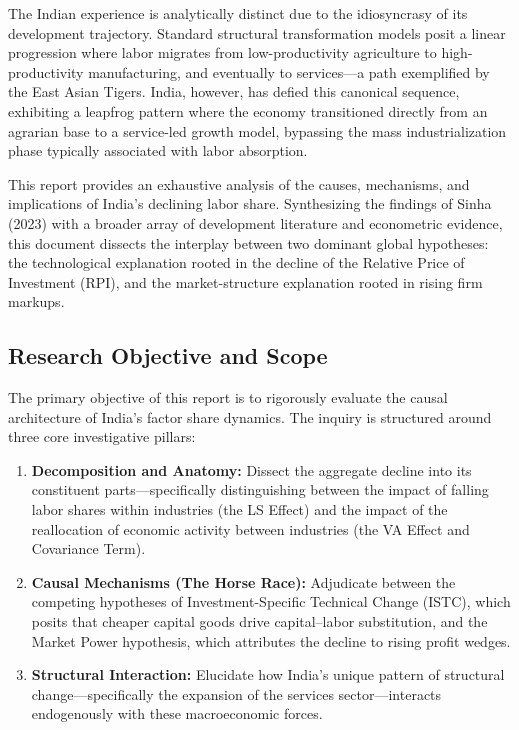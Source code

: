 \documentclass[12pt]{article}
\begin{document}
The Indian experience is analytically distinct due to the idiosyncrasy of its development trajectory. Standard structural transformation models posit a linear progression where labor migrates from low-productivity agriculture to high-productivity manufacturing, and eventually to services—a path exemplified by the East Asian Tigers. India, however, has defied this canonical sequence, exhibiting a leapfrog pattern where the economy transitioned directly from an agrarian base to a service-led growth model, bypassing the mass industrialization phase typically associated with labor absorption.

This report provides an exhaustive analysis of the causes, mechanisms, and implications of India's declining labor share. Synthesizing the findings of Sinha (2023) with a broader array of development literature and econometric evidence, this document dissects the interplay between two dominant global hypotheses: the technological explanation rooted in the decline of the Relative Price of Investment (RPI), and the market-structure explanation rooted in rising firm markups.
\newpage
\subsection{Research Objective and Scope}
The primary objective of this report is to rigorously evaluate the causal architecture of India's factor share dynamics. The inquiry is structured around three core investigative pillars:
\begin{enumerate}[leftmargin=*,itemsep=4pt]
\item \textbf{Decomposition and Anatomy:} Dissect the aggregate decline into its constituent parts—specifically distinguishing between the impact of falling labor shares within industries (the LS Effect) and the impact of the reallocation of economic activity between industries (the VA Effect and Covariance Term).
\item \textbf{Causal Mechanisms (The Horse Race):} Adjudicate between the competing hypotheses of Investment-Specific Technical Change (ISTC), which posits that cheaper capital goods drive capital–labor substitution, and the Market Power hypothesis, which attributes the decline to rising profit wedges.
\item \textbf{Structural Interaction:} Elucidate how India’s unique pattern of structural change—specifically the expansion of the services sector—interacts endogenously with these macroeconomic forces.
\end{enumerate}
\end{document}
